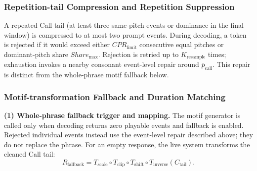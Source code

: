 \documentclass[11pt,a4paper]{article}
\begin{document}
\subsubsection{Repetition-tail Compression and Repetition Suppression}
\label{sec:repetition-tail-suppression}

A repeated Call tail (at least three same-pitch events or dominance in the final window) is compressed to at most two prompt events. During decoding, a token is rejected if it would exceed either $CPR_{\mathrm{limit}}$ consecutive equal pitches or dominant-pitch share $Share_{\max}$. Rejection is retried up to $K_{\mathrm{resample}}$ times; exhaustion invokes a nearby consonant event-level repair around $\bar p_{\mathrm{call}}$. This repair is distinct from the whole-phrase motif fallback below.

\subsubsection{Motif-transformation Fallback and Duration Matching}
\label{sec:fallback-duration-matching}

\noindent\textbf{(1) Whole-phrase fallback trigger and mapping.}
The motif generator is called only when decoding returns zero playable events and fallback is enabled. Rejected individual events instead use the event-level repair described above; they do not replace the phrase. For an empty response, the live system transforms the cleaned Call tail:
\begin{equation}
R_{\mathrm{fallback}}
=
T_{\mathrm{scale}}
\circ T_{\mathrm{clip}}
\circ T_{\mathrm{shift}}
\circ T_{\mathrm{inverse}}
(C_{\mathrm{tail}}).
\label{eq:motif-fallback}
\end{equation}
\end{document}
